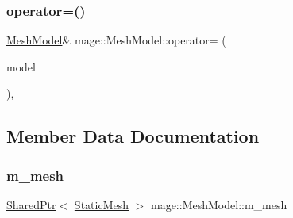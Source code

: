 \hypertarget{classmage_1_1_mesh_model_ab01cee26691745ec7cd1af933bb5fa99}{}\label{classmage_1_1_mesh_model_ab01cee26691745ec7cd1af933bb5fa99} 
\subsubsection{\texorpdfstring{operator=()}{operator=()}\hspace{0.1cm}{\footnotesize\ttfamily [2/2]}}
{\footnotesize\ttfamily \hyperlink{classmage_1_1_mesh_model}{Mesh\+Model}\& mage\+::\+Mesh\+Model\+::operator= (\begin{DoxyParamCaption}\item[{\hyperlink{classmage_1_1_mesh_model}{Mesh\+Model} \&\&}]{model }\end{DoxyParamCaption})\hspace{0.3cm}{\ttfamily [private]}, {\ttfamily [delete]}}



\subsection{Member Data Documentation}
\hypertarget{classmage_1_1_mesh_model_a938e3a83fa927b2427212bd2e397aa87}{}\label{classmage_1_1_mesh_model_a938e3a83fa927b2427212bd2e397aa87} 
\subsubsection{\texorpdfstring{m\+\_\+mesh}{m\_mesh}}
{\footnotesize\ttfamily \hyperlink{namespacemage_a1e01ae66713838a7a67d30e44c67703e}{Shared\+Ptr}$<$ \hyperlink{classmage_1_1_static_mesh}{Static\+Mesh} $>$ mage\+::\+Mesh\+Model\+::m\+\_\+mesh\hspace{0.3cm}{\ttfamily [private]}}

